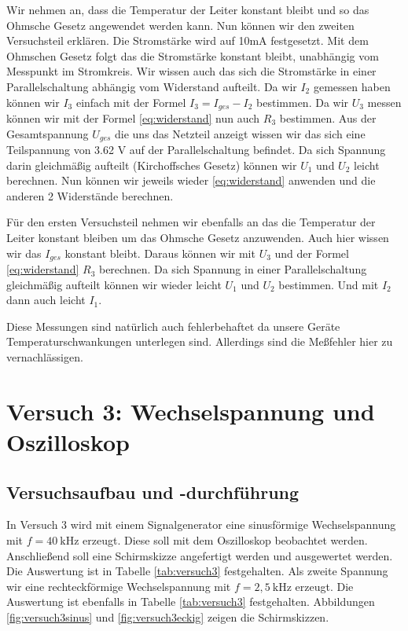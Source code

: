         Wir nehmen an, dass die Temperatur der Leiter konstant bleibt und so das Ohmsche Gesetz angewendet werden kann. Nun können wir den zweiten Versuchsteil erklären. Die Stromstärke wird auf 10mA festgesetzt. Mit dem Ohmschen Gesetz folgt das die Stromstärke konstant bleibt, unabhängig vom Messpunkt im Stromkreis. Wir wissen auch das sich die Stromstärke in einer Parallelschaltung abhängig vom Widerstand aufteilt. Da wir $I_2$ gemessen haben können wir $I_3$ einfach mit der Formel $I_3 = I_{ges} - I_2$ bestimmen. Da wir $U_3$ messen können wir mit der Formel \ref{eq:widerstand} nun auch $R_3$ bestimmen. Aus der Gesamtspannung $U_{ges}$ die uns das Netzteil anzeigt wissen wir das sich eine Teilspannung von 3.62 V auf der Parallelschaltung befindet. Da sich Spannung darin gleichmäßig aufteilt (Kirchoffsches Gesetz) können wir $U_1$ und $U_2$ leicht berechnen. Nun können wir jeweils wieder \ref{eq:widerstand} anwenden und die anderen 2 Widerstände berechnen.
        
        Für den ersten Versuchsteil nehmen wir ebenfalls an das die Temperatur der Leiter konstant bleiben um das Ohmsche Gesetz anzuwenden. Auch hier wissen wir das $I_{ges}$ konstant bleibt. Daraus können wir mit $U_3$ und der Formel \ref{eq:widerstand} $R_3$ berechnen. Da sich Spannung in einer Parallelschaltung gleichmäßig aufteilt können wir wieder leicht $U_1$ und $U_2$ bestimmen. Und mit $I_2$ dann auch leicht $I_1$. 
        
        Diese Messungen sind natürlich auch fehlerbehaftet da unsere Geräte Temperaturschwankungen unterlegen sind. Allerdings sind die Meßfehler hier zu vernachlässigen.
        \newpage

\section{Versuch 3: Wechselspannung und Oszilloskop}

    \subsection{Versuchsaufbau und -durchführung}
        
        In Versuch 3 wird mit einem Signalgenerator eine sinusförmige Wechselspannung mit $f = 40\ \mathrm{kHz}$ erzeugt. Diese soll mit dem Oszilloskop beobachtet werden. Anschließend soll eine Schirmskizze angefertigt werden und ausgewertet werden. Die Auswertung ist in Tabelle \ref{tab:versuch3} festgehalten. Als zweite Spannung wir eine rechteckförmige Wechselspannung mit $f = 2,5\ \mathrm{kHz}$ erzeugt. Die Auswertung ist ebenfalls in Tabelle \ref{tab:versuch3} festgehalten.
        Abbildungen \ref{fig:versuch3sinus} und \ref{fig:versuch3eckig} zeigen die Schirmskizzen.

